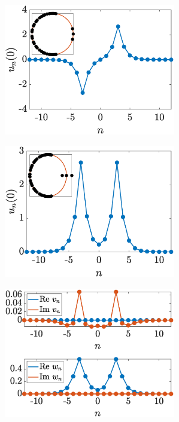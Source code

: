 \documentclass[12pt,reqno]{amsart}
\theoremstyle{definition}
\begin{document}
\begin{figure}
	\begin{center}
	\begin{subfigure}{0.45\linewidth}
		\caption{}
		\includegraphics[width=7.5cm]{doublepmun0insetspec.eps} \hspace{-0.5cm}
		\label{fig:doublea}
	\end{subfigure}
	\begin{subfigure}{0.45\linewidth}
		\caption{}
		\includegraphics[width=7.5cm]{doubleppun0insetspec.eps}
		\label{fig:doubleb}
	\end{subfigure}
	\begin{subfigure}{0.45\linewidth}
		\caption{}
		\includegraphics[width=7.5cm]{doubleinteig.eps} \hspace{-0.5cm}
		\label{fig:doublec}
	\end{subfigure}

\end{center}
\end{figure}
\end{document}
